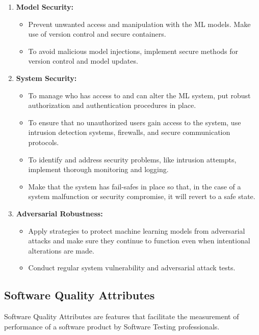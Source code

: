 \begin{enumerate}
    \item \textbf{Model Security:}
		\begin{itemize}
			\item Prevent unwanted access and manipulation with the ML models. Make use of version control and secure containers. 
			\item To avoid malicious model injections, implement secure methods for version control and model updates.
		\end{itemize}
    \item \textbf{System Security:}
		\begin{itemize}
			\item To manage who has access to and can alter the ML system, put robust authorization and authentication procedures in place.
			\item To ensure that no unauthorized users gain access to the system, use intrusion detection systems, firewalls, and secure communication protocols.
			\item To identify and address security problems, like intrusion attempts, implement thorough monitoring and logging.
			\item Make that the system has fail-safes in place so that, in the case of a system malfunction or security compromise, it will revert to a safe state.
		\end{itemize}
    \item \textbf{Adversarial Robustness:}
		\begin{itemize}
			\item Apply strategies to protect machine learning models from adversarial attacks and make sure they continue to function even when intentional alterations are made.
			\item Conduct regular system vulnerability and adversarial attack tests.
		\end{itemize}
\end{enumerate}


\subsection{Software Quality Attributes}
Software Quality Attributes are features that facilitate the measurement of performance of a software product by Software Testing professionals.

